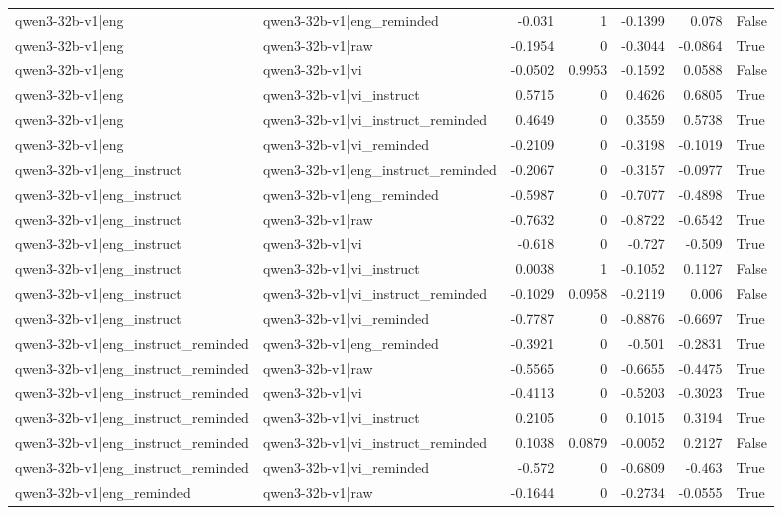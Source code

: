 \begin{table}
\begin{tabular}{l l r r r r l}
qwen3-32b-v1|eng & qwen3-32b-v1|eng_reminded & -0.031 & 1 & -0.1399 & 0.078 & False \\
qwen3-32b-v1|eng & qwen3-32b-v1|raw & -0.1954 & 0 & -0.3044 & -0.0864 & True \\
qwen3-32b-v1|eng & qwen3-32b-v1|vi & -0.0502 & 0.9953 & -0.1592 & 0.0588 & False \\
qwen3-32b-v1|eng & qwen3-32b-v1|vi_instruct & 0.5715 & 0 & 0.4626 & 0.6805 & True \\
qwen3-32b-v1|eng & qwen3-32b-v1|vi_instruct_reminded & 0.4649 & 0 & 0.3559 & 0.5738 & True \\
qwen3-32b-v1|eng & qwen3-32b-v1|vi_reminded & -0.2109 & 0 & -0.3198 & -0.1019 & True \\
qwen3-32b-v1|eng_instruct & qwen3-32b-v1|eng_instruct_reminded & -0.2067 & 0 & -0.3157 & -0.0977 & True \\
qwen3-32b-v1|eng_instruct & qwen3-32b-v1|eng_reminded & -0.5987 & 0 & -0.7077 & -0.4898 & True \\
qwen3-32b-v1|eng_instruct & qwen3-32b-v1|raw & -0.7632 & 0 & -0.8722 & -0.6542 & True \\
qwen3-32b-v1|eng_instruct & qwen3-32b-v1|vi & -0.618 & 0 & -0.727 & -0.509 & True \\
qwen3-32b-v1|eng_instruct & qwen3-32b-v1|vi_instruct & 0.0038 & 1 & -0.1052 & 0.1127 & False \\
qwen3-32b-v1|eng_instruct & qwen3-32b-v1|vi_instruct_reminded & -0.1029 & 0.0958 & -0.2119 & 0.006 & False \\
qwen3-32b-v1|eng_instruct & qwen3-32b-v1|vi_reminded & -0.7787 & 0 & -0.8876 & -0.6697 & True \\
qwen3-32b-v1|eng_instruct_reminded & qwen3-32b-v1|eng_reminded & -0.3921 & 0 & -0.501 & -0.2831 & True \\
qwen3-32b-v1|eng_instruct_reminded & qwen3-32b-v1|raw & -0.5565 & 0 & -0.6655 & -0.4475 & True \\
qwen3-32b-v1|eng_instruct_reminded & qwen3-32b-v1|vi & -0.4113 & 0 & -0.5203 & -0.3023 & True \\
qwen3-32b-v1|eng_instruct_reminded & qwen3-32b-v1|vi_instruct & 0.2105 & 0 & 0.1015 & 0.3194 & True \\
qwen3-32b-v1|eng_instruct_reminded & qwen3-32b-v1|vi_instruct_reminded & 0.1038 & 0.0879 & -0.0052 & 0.2127 & False \\
qwen3-32b-v1|eng_instruct_reminded & qwen3-32b-v1|vi_reminded & -0.572 & 0 & -0.6809 & -0.463 & True \\
qwen3-32b-v1|eng_reminded & qwen3-32b-v1|raw & -0.1644 & 0 & -0.2734 & -0.0555 & True \\

\end{tabular}
\end{table}
